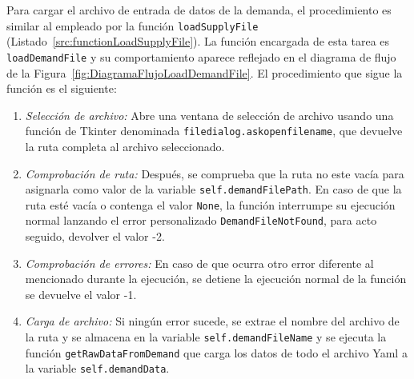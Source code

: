 
Para cargar el archivo de entrada de datos de la demanda, el procedimiento es similar al empleado por la función \texttt{loadSupplyFile} (Listado~\ref{src:functionLoadSupplyFile}). La función encargada de esta tarea es \texttt{loadDemandFile} y su comportamiento aparece reflejado en el diagrama de flujo de la Figura~\ref{fig:DiagramaFlujoLoadDemandFile}. El procedimiento que sigue la función es el siguiente:
\begin{enumerate}
    \item \textit{Selección de archivo:} Abre una ventana de selección de archivo usando una función de Tkinter denominada \texttt{filedialog.askopenfilename}, que devuelve la ruta completa al archivo seleccionado.
    \item \textit{Comprobación de ruta:} Después, se comprueba que la ruta no este vacía para asignarla como valor de la variable \texttt{self.demandFilePath}. En caso de que la ruta esté vacía o contenga el valor \texttt{None}, la función interrumpe su ejecución normal lanzando el error personalizado \texttt{DemandFileNotFound}, para acto seguido, devolver el valor -2.
    \item \textit{Comprobación de errores:} En caso de que ocurra otro error diferente al mencionado durante la ejecución, se detiene la ejecución normal de la función se devuelve el valor -1.
    \item \textit{Carga de archivo:} Si ningún error sucede, se extrae el nombre del archivo de la ruta y se almacena en la variable \texttt{self.demandFileName} y se ejecuta la función \texttt{getRawDataFromDemand} que carga los datos de todo el archivo \acrshort{Yaml} a la variable \texttt{self.demandData}.
\end{enumerate}


